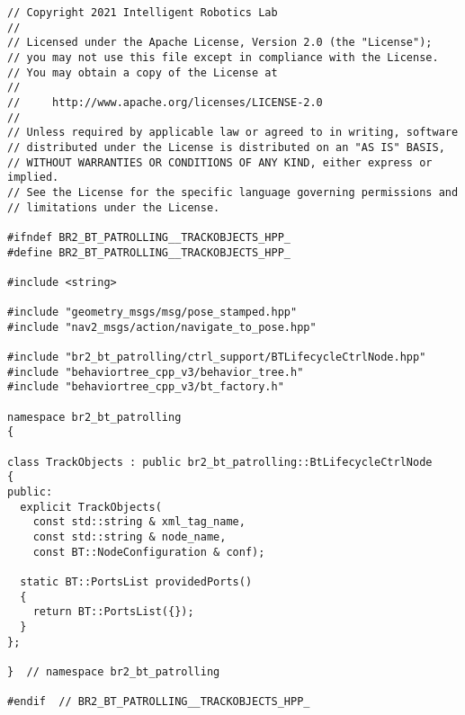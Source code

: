  \footnotesize
\begin{tcolorbox}[sharp corners, colframe=gray!80, colback=LightGray, left=0pt, top=0pt, bottom=0pt, title=\texttt{br2\_bt\_patrolling/include/br2\_bt\_patrolling/TrackObjects.hpp}]
  \begin{verbatim}
// Copyright 2021 Intelligent Robotics Lab
//
// Licensed under the Apache License, Version 2.0 (the "License");
// you may not use this file except in compliance with the License.
// You may obtain a copy of the License at
//
//     http://www.apache.org/licenses/LICENSE-2.0
//
// Unless required by applicable law or agreed to in writing, software
// distributed under the License is distributed on an "AS IS" BASIS,
// WITHOUT WARRANTIES OR CONDITIONS OF ANY KIND, either express or implied.
// See the License for the specific language governing permissions and
// limitations under the License.

#ifndef BR2_BT_PATROLLING__TRACKOBJECTS_HPP_
#define BR2_BT_PATROLLING__TRACKOBJECTS_HPP_

#include <string>

#include "geometry_msgs/msg/pose_stamped.hpp"
#include "nav2_msgs/action/navigate_to_pose.hpp"

#include "br2_bt_patrolling/ctrl_support/BTLifecycleCtrlNode.hpp"
#include "behaviortree_cpp_v3/behavior_tree.h"
#include "behaviortree_cpp_v3/bt_factory.h"

namespace br2_bt_patrolling
{

class TrackObjects : public br2_bt_patrolling::BtLifecycleCtrlNode
{
public:
  explicit TrackObjects(
    const std::string & xml_tag_name,
    const std::string & node_name,
    const BT::NodeConfiguration & conf);

  static BT::PortsList providedPorts()
  {
    return BT::PortsList({});
  }
};

}  // namespace br2_bt_patrolling

#endif  // BR2_BT_PATROLLING__TRACKOBJECTS_HPP_
    \end{verbatim}
    \end{tcolorbox}
  \normalsize

